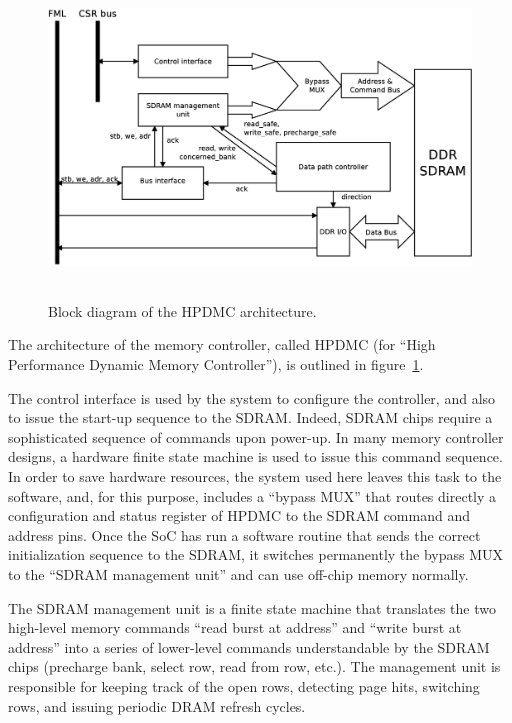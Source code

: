 \documentclass[a4paper,11pt]{kthesis}
\begin{document}
\begin{figure}[H]
\centering
\includegraphics[height=85mm]{hpdmc_block.eps}
\caption{Block diagram of the HPDMC architecture.}\label{fig:hpdmc_block}
\end{figure}

The architecture of the memory controller, called HPDMC (for ``High Performance Dynamic Memory Controller''), is outlined in figure~\ref{fig:hpdmc_block}.

The control interface is used by the system to configure the controller, and also to issue the start-up sequence to the SDRAM. Indeed, SDRAM chips require a sophisticated sequence of commands upon power-up. In many memory controller designs, a hardware finite state machine is used to issue this command sequence. In order to save hardware resources, the system used  here leaves this task to the software, and, for this purpose, includes a ``bypass MUX'' that routes directly a configuration and status register of HPDMC to the SDRAM command and address pins. Once the SoC has run a software routine that sends the correct initialization sequence to the SDRAM, it switches permanently the bypass MUX to the ``SDRAM management unit'' and can use off-chip memory normally.

The SDRAM management unit is a finite state machine that translates the two high-level memory commands ``read burst at address'' and ``write burst at address'' into a series of lower-level commands understandable by the SDRAM chips (precharge bank, select row, read from row, etc.). The management unit is responsible for keeping track of the open rows, detecting page hits, switching rows, and issuing periodic DRAM refresh cycles.
\end{document}
